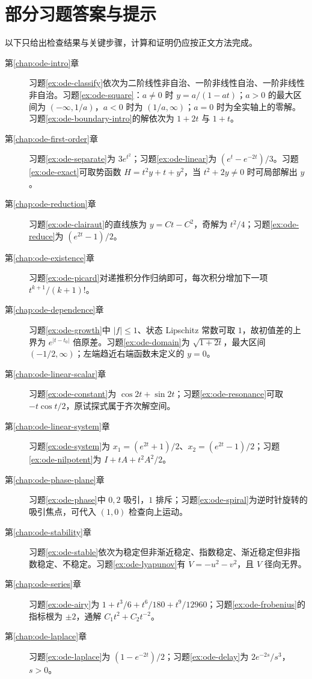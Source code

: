 \section{部分习题答案与提示}
以下只给出检查结果与关键步骤，计算和证明仍应按正文方法完成。
\begin{description}
 \item[第\ref{chap:ode-intro}章] 习题\ref{ex:ode-classify}依次为二阶线性非自治、一阶非线性自治、一阶非线性非自治。习题\ref{ex:ode-square}：$a\ne0$ 时 $y=a/(1-at)$；$a>0$ 的最大区间为 $(-\infty,1/a)$，$a<0$ 时为 $(1/a,\infty)$；$a=0$ 时为全实轴上的零解。习题\ref{ex:ode-boundary-intro}的解依次为 $1+2t$ 与 $1+t$。
 \item[第\ref{chap:ode-first-order}章] 习题\ref{ex:ode-separate}为 $3e^{t^2}$；习题\ref{ex:ode-linear}为 $(e^t-e^{-2t})/3$。习题\ref{ex:ode-exact}可取势函数 $H=t^2y+t+y^2$，当 $t^2+2y\ne0$ 时可局部解出 $y$。
 \item[第\ref{chap:ode-reduction}章] 习题\ref{ex:ode-clairaut}的直线族为 $y=Ct-C^2$，奇解为 $t^2/4$；习题\ref{ex:ode-reduce}为 $(e^{2t}-1)/2$。
 \item[第\ref{chap:ode-existence}章] 习题\ref{ex:ode-picard}对递推积分作归纳即可，每次积分增加下一项 $t^{k+1}/(k+1)!$。
 \item[第\ref{chap:ode-dependence}章] 习题\ref{ex:ode-growth}中 $|f|\leq1$、状态 Lipschitz 常数可取 $1$，故初值差的上界为 $e^{|t-t_0|}$ 倍原差。习题\ref{ex:ode-domain}为 $\sqrt{1+2t}$，最大区间 $(-1/2,\infty)$；左端趋近右端函数未定义的 $y=0$。
 \item[第\ref{chap:ode-linear-scalar}章] 习题\ref{ex:ode-constant}为 $\cos2t+\sin2t$；习题\ref{ex:ode-resonance}可取 $-t\cos t/2$，原试探式属于齐次解空间。
 \item[第\ref{chap:ode-linear-system}章] 习题\ref{ex:ode-system}为 $x_1=(e^{2t}+1)/2$、$x_2=(e^{2t}-1)/2$；习题\ref{ex:ode-nilpotent}为 $I+tA+t^2A^2/2$。
 \item[第\ref{chap:ode-phase-plane}章] 习题\ref{ex:ode-phase}中 $0,2$ 吸引，$1$ 排斥；习题\ref{ex:ode-spiral}为逆时针旋转的吸引焦点，可代入 $(1,0)$ 检查向上运动。
 \item[第\ref{chap:ode-stability}章] 习题\ref{ex:ode-stable}依次为稳定但非渐近稳定、指数稳定、渐近稳定但非指数稳定、不稳定。习题\ref{ex:ode-lyapunov}有 $\dot V=-u^2-v^2$，且 $V$ 径向无界。
 \item[第\ref{chap:ode-series}章] 习题\ref{ex:ode-airy}为 $1+t^3/6+t^6/180+t^9/12960$；习题\ref{ex:ode-frobenius}的指标根为 $\pm2$，通解 $C_1t^2+C_2t^{-2}$。
 \item[第\ref{chap:ode-laplace}章] 习题\ref{ex:ode-laplace}为 $(1-e^{-2t})/2$；习题\ref{ex:ode-delay}为 $2e^{-2s}/s^3$，$s>0$。

\end{description}
